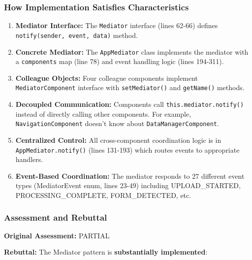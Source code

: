 \documentclass[11pt]{article}
\begin{document}
\subsubsection{How Implementation Satisfies Characteristics}

\begin{enumerate}[noitemsep]
    \item \textbf{Mediator Interface:} The \texttt{Mediator} interface (lines 62-66) defines \texttt{notify(sender, event, data)} method.

    \item \textbf{Concrete Mediator:} The \texttt{AppMediator} class implements the mediator with a \texttt{components} map (line 78) and event handling logic (lines 194-311).

    \item \textbf{Colleague Objects:} Four colleague components implement \texttt{MediatorComponent} interface with \texttt{setMediator()} and \texttt{getName()} methods.

    \item \textbf{Decoupled Communication:} Components call \texttt{this.mediator.notify()} instead of directly calling other components. For example, \texttt{NavigationComponent} doesn't know about \texttt{DataManagerComponent}.

    \item \textbf{Centralized Control:} All cross-component coordination logic is in \texttt{AppMediator.notify()} (lines 131-193) which routes events to appropriate handlers.

    \item \textbf{Event-Based Coordination:} The mediator responds to 27 different event types (MediatorEvent enum, lines 23-49) including UPLOAD\_STARTED, PROCESSING\_COMPLETE, FORM\_DETECTED, etc.
\end{enumerate}

\subsubsection{Assessment and Rebuttal}
\textbf{Original Assessment:} PARTIAL

\textbf{Rebuttal:} The Mediator pattern is \textbf{substantially implemented}:
\end{document}
